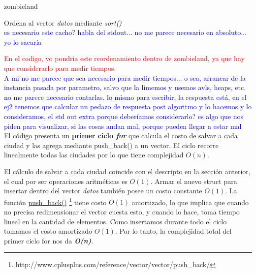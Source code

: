 \documentclass[a4paper]{article}
\begin{document}
\begin{algorithm}[h!]
\caption{zombieland}
Ordena al vector \emph{datos} mediante \textit{sort()}\\
\textcolor{blue}{es necesario este cacho? habla del stdout... no me parece necesario en absoluto... yo lo sacar\'ia}\\
\end{algorithm}
\textcolor{red}{En el codigo, yo pondria este reordenamiento dentro de zombieland, ya que hay que considerarlo para medir tiempos.}\\
\textcolor{blue}{A mi no me parece que sea necesario para medir tiempos... o sea, arrancar de la instancia pasada por parametro, salvo que la limemos y usemos avls, heaps, etc. no me parece necesario contarlas. lo mismo para escribir, la respuesta est\'a, en el ej2 tenemos que calcular un pedazo de respuesta post algoritmo y lo hacemos y lo consideramos, el std out extra porque deber\'iamos considerarlo? es algo que nos piden para visualizar, si las cosas andan mal, porque pueden llegar a estar mal}\\

El c\'odigo presenta un \textbf{primer ciclo \emph{for}} que calcula el costo de salvar a cada ciudad y las agrega mediante push_back() a un vector. El ciclo recorre linealmente todas las ciudades por lo que tiene complejidad $O(n)$. 

El c\'alculo de salvar a cada ciudad coincide con el descripto en la secci\'on anterior, el cual por ser operaciones aritm\'eticas es $O(1)$. Armar el nuevo struct para insertar dentro del vector \emph{datos} tambi\'en posee un costo constante $O(1)$. La funci\'on \href{http://www.cplusplus.com/reference/vector/vector/push_back/}{push\_back()} \footnote{http://www.cplusplus.com/reference/vector/vector/push_back/} tiene costo $O(1)$ amortizado, lo que implica que cuando no precisa redimensionar el vector cuesta esto, y cuando lo hace, toma tiempo lineal en la cantidad de elementos. Como insertamos durante todo el ciclo tomamos el costo amortizado $O(1)$.
Por lo tanto, la complejidad total del primer ciclo for nos da \textbf{\textit{O(n)}}.\\
\end{document}
